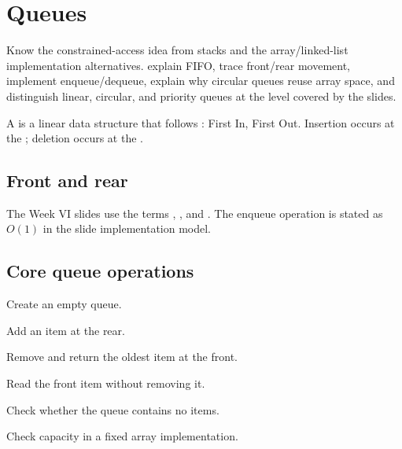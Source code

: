 \chapter{Queues}\label{ch:queues}

\chapterguide%
  {Know the constrained-access idea from stacks and the array/linked-list implementation alternatives.}
  {explain FIFO, trace front/rear movement, implement enqueue/dequeue, explain why circular queues reuse array space, and distinguish linear, circular, and priority queues at the level covered by the slides.}

A  is a linear data structure that follows : First In, First Out. Insertion occurs at the ; deletion occurs at the .

\section{Front and rear}

\begin{mlfigure}
\end{mlfigure}

The Week VI slides use the terms , , and . The enqueue operation is stated as $O(1)$ in the slide implementation model.

\section{Core queue operations}

\begin{description}[leftmargin=1.3in,style=nextline]
  \item[Create Q] Create an empty queue.
  \item[enqueue()] Add an item at the rear.
  \item[dequeue()] Remove and return the oldest item at the front.
  \item[peek/front] Read the front item without removing it.
  \item[isEmpty()] Check whether the queue contains no items.
  \item[isFull()] Check capacity in a fixed array implementation.
\end{description}

